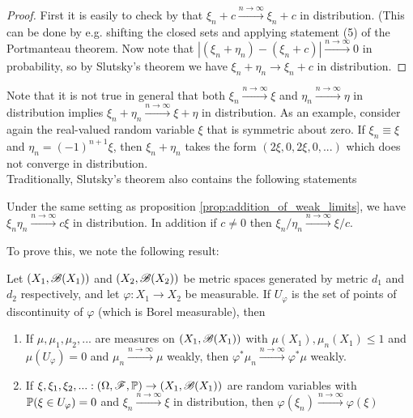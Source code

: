 \begin{proof}
First it is easily to check by that $\xi_n + c \overset{n\to\infty}{\to} \xi_n + c$ in distribution. (This can be done by e.g. shifting the closed sets and applying statement (5) of the Portmanteau theorem. Now note that $|(\xi_n + \eta_n) - (\xi_n + c)| \overset{n\to\infty}\to 0$ in probability, so by Slutsky's theorem we have $\xi_n + \eta_n \to \xi_n + c$ in distribution.
\end{proof}

Note that it is not true in general that both $\xi_n \overset{n\to\infty}\to \xi$ and $\eta_n \overset{n\to\infty}\to \eta$ in distribution implies $\xi_n + \eta_n \overset{n\to\infty}\to \xi + \eta$ in distribution. As an example, consider again the real-valued random variable $\xi$ that is symmetric about zero. If $\xi_n \equiv \xi$ and $\eta_n = (-1)^{n+1} \xi$, then $\xi_n + \eta_n$ takes the form $(2\xi, 0, 2\xi, 0, ...)$ which does not converge in distribution.\\

Traditionally, Slutsky's theorem also contains the following statements
\begin{proposition} \label{prop:mult_of_weak_limits}
Under the same setting as proposition \ref{prop:addition_of_weak_limits}, we have $\xi_n \eta_n \overset{n\to\infty}{\to} c\xi$ in distribution. In addition if $c \neq 0$ then $\xi_n / \eta_n \overset{n\to\infty}{\to} \xi / c$.
\end{proposition}

To prove this, we note the following result:
\begin{proposition} 
Let $(X_1,\mathcal{B}(X_1))$ and $(X_2,\mathcal{B}(X_2))$ be metric spaces generated by metric $d_1$ and $d_2$ respectively, and let $\varphi: X_1 \to X_2$ be measurable. If $U_\varphi$ is the set of points of discontinuity of $\varphi$ (which is Borel measurable), then
\begin{enumerate}
\item If $\mu, \mu_1, \mu_2, ...$ are measures on $(X_1,\mathcal{B}(X_1))$ with $\mu(X_1), \mu_n(X_1) \leq 1$ and $\mu(U_\varphi) = 0$ and $\mu_n \overset{n\to\infty}\to \mu$ weakly, then $\varphi^*\mu_n \overset{n\to\infty}{\to} \varphi^*\mu$ weakly.
\item If $\xi, \xi_1, \xi_2, ...: (\Omega,\mathcal{F},\mathbb{P}) \to (X_1, \mathcal{B}(X_1))$ are random variables with $\mathbb{P}(\xi \in U_\varphi) = 0$ and $\xi_n \overset{n\to\infty}\to \xi$ in distribution, then $\varphi(\xi_n) \overset{n\to\infty}\to \varphi(\xi)$
\end{enumerate}
\end{proposition}

